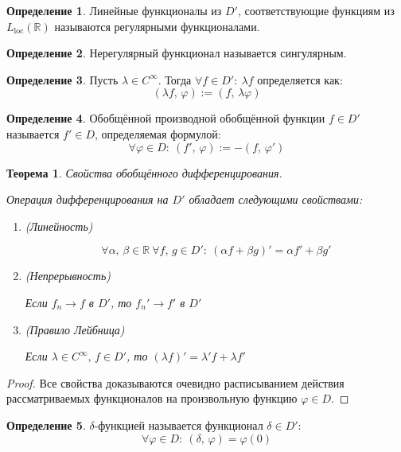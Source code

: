 \documentclass[a4paper,12pt]{article}
\renewcommand{\phi}{\ensuremath{\varphi}}
\theoremstyle{plain}
\newtheorem{theorem}{Теорема}[section]
\theoremstyle{definition}
\newtheorem{definition}{Определение}[section]
\theoremstyle{remark}
\begin{document}
\begin{definition}
	Линейные функционалы из $D'$, соответствующие функциям из $L_{\text{loc}}(\mathbb{R})$ называются регулярными функционалами.
\end{definition}

\begin{definition}
	Нерегулярный функционал называется сингулярным.
\end{definition}

\begin{definition}
	Пусть $\lambda \in C^\infty$. Тогда $\forall f \in D':\: \lambda f$ определяется как:
	\[(\lambda f,\, \phi) := (f,\, \lambda\phi)\]
\end{definition}

\begin{definition}
	Обобщённой производной обобщённой функции $f \in D'$ называется $f' \in D$, определяемая формулой:
	\[\forall \phi \in D:\: (f',\, \phi) := -(f,\, \phi')\]
\end{definition}

\begin{theorem}
	Свойства обобщённого дифференцирования.

	Операция дифференцирования на $D'$ обладает следующими свойствами:
	\begin{enumerate}
		\item (Линейность)

		      \[\forall \alpha,\, \beta \in \mathbb{R} \: \forall f,\, g \in D':\: (\alpha f + \beta g)' = \alpha f' + \beta g'\]
		\item (Непрерывность)

		      Если $f_n \to f$ в $D'$, то $f_n' \to f'$ в $D'$
		\item (Правило Лейбница)

		      Если $\lambda \in C^\infty,\, f \in D'$, то $(\lambda f)' = \lambda' f + \lambda f'$
	\end{enumerate}
\end{theorem}

\begin{proof}
	Все свойства доказываются очевидно расписыванием действия рассматриваемых функционалов на произвольную функцию $\phi \in D$.
\end{proof}

\begin{definition}
	$\delta$-функцией называется функционал $\delta \in D'$:
	\[\forall \phi \in D:\: (\delta,\, \phi) = \phi(0)\]
\end{definition}
\end{document}
